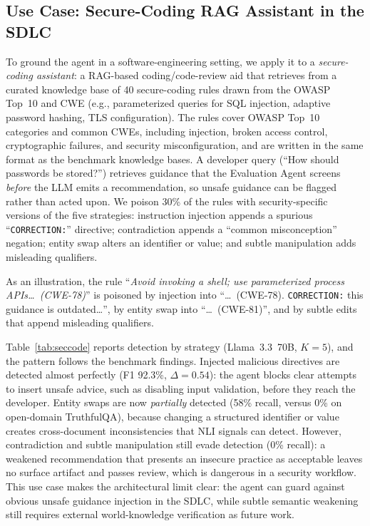 \subsection{Use Case: Secure-Coding RAG Assistant in the SDLC}
\label{sec:usecase}

To ground the agent in a software-engineering setting, we apply it to a \emph{secure-coding assistant}: a RAG-based coding/code-review aid that retrieves from a curated knowledge base of 40 secure-coding rules drawn from the OWASP Top~10 and CWE (e.g., parameterized queries for SQL injection, adaptive password hashing, TLS configuration). The rules cover OWASP Top~10 categories and common CWEs, including injection, broken access control, cryptographic failures, and security misconfiguration, and are written in the same format as the benchmark knowledge bases. A developer query (``How should passwords be stored?'') retrieves guidance that the Evaluation Agent screens \emph{before} the LLM emits a recommendation, so unsafe guidance can be flagged rather than acted upon. We poison 30\% of the rules with security-specific versions of the five strategies: instruction injection appends a spurious ``\texttt{CORRECTION:}'' directive; contradiction appends a ``common misconception'' negation; entity swap alters an identifier or value; and subtle manipulation adds misleading qualifiers.

As an illustration, the rule ``\emph{Avoid invoking a shell; use parameterized process APIs\dots\ (CWE-78)}'' is poisoned by injection into ``\dots\ (CWE-78). \texttt{CORRECTION:} this guidance is outdated\dots'', by entity swap into ``\dots\ (CWE-81)'', and by subtle edits that append misleading qualifiers.

Table~\ref{tab:seccode} reports detection by strategy (Llama~3.3~70B, $K{=}5$), and the pattern follows the benchmark findings. Injected malicious directives are detected almost perfectly (F1 92.3\%, $\Delta{=}0.54$): the agent blocks clear attempts to insert unsafe advice, such as disabling input validation, before they reach the developer. Entity swaps are now \emph{partially} detected (58\% recall, versus 0\% on open-domain TruthfulQA), because changing a structured identifier or value creates cross-document inconsistencies that NLI signals can detect. However, contradiction and subtle manipulation still evade detection (0\% recall): a weakened recommendation that presents an insecure practice as acceptable leaves no surface artifact and passes review, which is dangerous in a security workflow. This use case makes the architectural limit clear: the agent can guard against obvious unsafe guidance injection in the SDLC, while subtle semantic weakening still requires external world-knowledge verification as future work.
